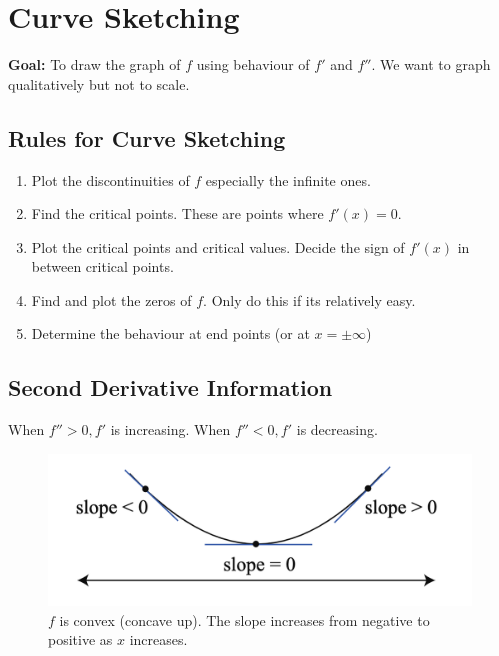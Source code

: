 

\chapter{Curve Sketching}

\bigbreak

{\bf Goal: } To draw the graph of $f$ using behaviour of $f'$ and $f''$. 
We want to graph qualitatively but not to scale. 


\section{Rules for Curve Sketching}

\begin{enumerate}
    \item Plot the discontinuities of $f$ especially the infinite ones.
    \item Find the critical points. These are points where $f'(x) = 0$.
    \item Plot the critical points and critical values. Decide the sign of $f'(x)$ in between critical points.
    \item Find and plot the zeros of $f$. Only do this if its relatively easy.
    \item Determine the behaviour at end points (or at $x = \pm \infty$)
\end{enumerate}


\section{Second Derivative Information}

When $f'' > 0, f'$ is increasing. When $f'' < 0, f'$ is decreasing.


\begin{figure}[ht!]
	\centering
	\includegraphics[scale=0.65]{./images/lecture_8_figure_1.png}
	\caption{$f$ is convex (concave up). The slope increases from negative to positive as $x$ increases.}
\end{figure}


